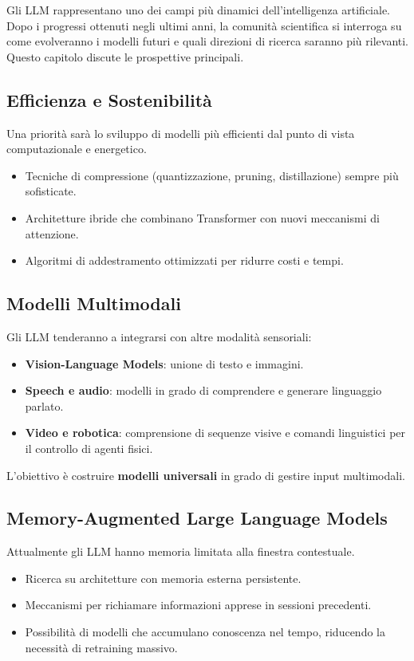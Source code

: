 Gli LLM rappresentano uno dei campi più dinamici dell'intelligenza artificiale. 
Dopo i progressi ottenuti negli ultimi anni, la comunità scientifica 
si interroga su come evolveranno i modelli futuri e quali direzioni di ricerca 
saranno più rilevanti. 
Questo capitolo discute le prospettive principali.

\subsection{Efficienza e Sostenibilità}
Una priorità sarà lo sviluppo di modelli più efficienti dal punto di vista computazionale e energetico.
\begin{itemize}
    \item Tecniche di compressione (quantizzazione, pruning, distillazione) sempre più sofisticate.
    \item Architetture ibride che combinano Transformer con nuovi meccanismi di attenzione.
    \item Algoritmi di addestramento ottimizzati per ridurre costi e tempi.
\end{itemize}

\subsection{Modelli Multimodali}
Gli LLM tenderanno a integrarsi con altre modalità sensoriali:
\begin{itemize}
    \item \textbf{Vision-Language Models}: unione di testo e immagini.
    \item \textbf{Speech e audio}: modelli in grado di comprendere e generare linguaggio parlato.
    \item \textbf{Video e robotica}: comprensione di sequenze visive e comandi linguistici per il controllo di agenti fisici.
\end{itemize}
L'obiettivo è costruire \textbf{modelli universali} in grado di gestire input multimodali.

\subsection{Memory-Augmented Large Language Models}
Attualmente gli LLM hanno memoria limitata alla finestra contestuale.
\begin{itemize}
    \item Ricerca su architetture con memoria esterna persistente.
    \item Meccanismi per richiamare informazioni apprese in sessioni precedenti.
    \item Possibilità di modelli che accumulano conoscenza nel tempo, riducendo la necessità di retraining massivo.
\end{itemize}

